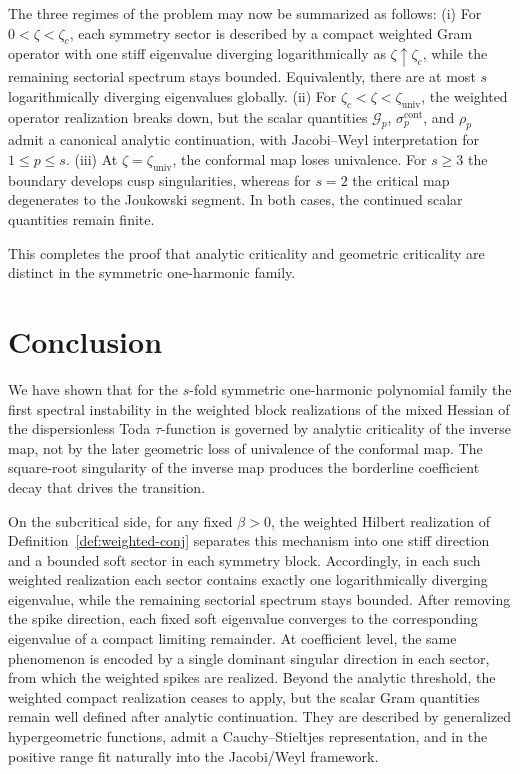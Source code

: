 \documentclass[11pt]{amsart}
\numberwithin{equation}{section}
\theoremstyle{plain}
\theoremstyle{definition}
\theoremstyle{remark}
\begin{document}
The three regimes of the problem may now be summarized as follows: (i) For
\(0<\zeta<\zeta_c\), each symmetry sector is described by a compact weighted
Gram operator with one stiff eigenvalue diverging logarithmically as
\(\zeta\uparrow\zeta_c\), while the remaining sectorial spectrum stays
bounded. Equivalently, there are at most \(s\) logarithmically diverging
eigenvalues globally. (ii) For \(\zeta_c<\zeta<\zeta_{\mathrm{univ}}\), the
weighted operator realization breaks down, but the scalar quantities
\(\mathcal G_p\), \(\sigma_p^{\mathrm{cont}}\), and \(\rho_p\) admit a
canonical analytic continuation, with Jacobi--Weyl interpretation for
\(1\le p\le s\). (iii) At \(\zeta=\zeta_{\mathrm{univ}}\), the conformal map
loses univalence. For \(s\ge3\) the boundary develops cusp singularities,
whereas for \(s=2\) the critical map degenerates to the Joukowski segment. In
both cases, the continued scalar quantities remain finite.


This completes the proof that analytic criticality and geometric criticality
are distinct in the symmetric one-harmonic family.


\section*{Conclusion}


We have shown that for the \(s\)-fold symmetric one-harmonic polynomial
family the first spectral instability in the weighted block realizations of
the mixed Hessian of the dispersionless Toda \(\tau\)-function is governed by
analytic criticality of the inverse map, not by the later geometric loss of
univalence of the conformal map. The square-root singularity of the inverse map produces the
borderline coefficient decay that drives the transition.

On the subcritical side, for any fixed \(\beta>0\), the weighted Hilbert
realization of Definition~\ref{def:weighted-conj} separates this mechanism
into one stiff direction and a bounded soft sector in each symmetry block.
Accordingly, in each such weighted realization each sector contains exactly
one logarithmically diverging eigenvalue, while the remaining sectorial
spectrum stays bounded. After removing the spike direction, each fixed soft
eigenvalue converges to the corresponding eigenvalue of a compact limiting
remainder. At coefficient level, the same phenomenon is encoded by a single
dominant singular direction in each sector, from which the weighted spikes
are realized. Beyond the analytic threshold, the weighted compact
realization ceases to apply, but the scalar Gram quantities remain well defined
after analytic continuation. They are described by generalized hypergeometric
functions, admit a Cauchy--Stieltjes representation, and in the positive
range fit naturally into the Jacobi/Weyl framework.
\end{document}
